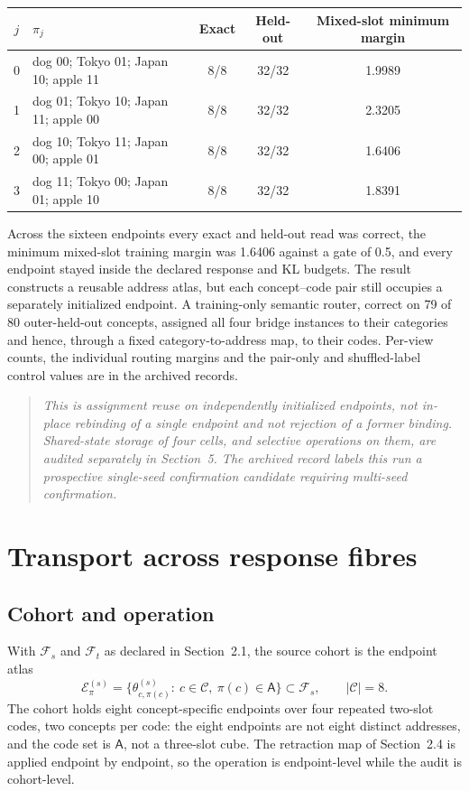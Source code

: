 \documentclass[11pt]{article}
\newenvironment{scopebox}{\begin{quote}\small\itshape}{\end{quote}}
\begin{document}
\begin{center}\small
\begin{tabular}{clccc}
\toprule
$j$ & $\pi_j$ & Exact & Held-out & Mixed-slot minimum margin \\
\midrule
0 & dog 00; Tokyo 01; Japan 10; apple 11 & 8/8 & 32/32 & 1.9989 \\
1 & dog 01; Tokyo 10; Japan 11; apple 00 & 8/8 & 32/32 & 2.3205 \\
2 & dog 10; Tokyo 11; Japan 00; apple 01 & 8/8 & 32/32 & 1.6406 \\
3 & dog 11; Tokyo 00; Japan 01; apple 10 & 8/8 & 32/32 & 1.8391 \\
\bottomrule
\end{tabular}
\end{center}

Across the sixteen endpoints every exact and held-out read was correct, the minimum mixed-slot training margin
was 1.6406 against a gate of 0.5, and every endpoint stayed inside the declared response and KL budgets. The
result constructs a reusable address atlas, but each concept--code pair still occupies a separately initialized
endpoint. A training-only semantic router, correct on 79 of 80 outer-held-out concepts, assigned all four
bridge instances to their categories and hence, through a fixed category-to-address map, to their codes.
Per-view counts, the individual routing margins and the pair-only and shuffled-label control values are in the
archived records.

\begin{scopebox}
This is assignment reuse on independently initialized endpoints, not in-place rebinding of a single endpoint
and not rejection of a former binding. Shared-state storage of four cells, and selective operations on them,
are audited separately in Section~5. The archived record labels this run a prospective single-seed confirmation
candidate requiring multi-seed confirmation.
\end{scopebox}

\section{Transport across response fibres}

\subsection{Cohort and operation}

With $\mathcal{F}_s$ and $\mathcal{F}_t$ as declared in Section~2.1, the source cohort is the endpoint atlas
\begin{equation}
\mathcal{E}^{(s)}_\pi=\bigl\{\theta^{(s)}_{c,\pi(c)}:\ c\in\mathcal{C},\ \pi(c)\in\mathsf{A}\bigr\}\subset
\mathcal{F}_s,\qquad |\mathcal{C}|=8 .
\end{equation}
The cohort holds eight concept-specific endpoints over four repeated two-slot codes, two concepts per code: the
eight endpoints are not eight distinct addresses, and the code set is $\mathsf{A}$, not a three-slot cube. The
retraction map of Section~2.4 is applied endpoint by endpoint, so the operation is endpoint-level while the
audit is cohort-level.
\end{document}
